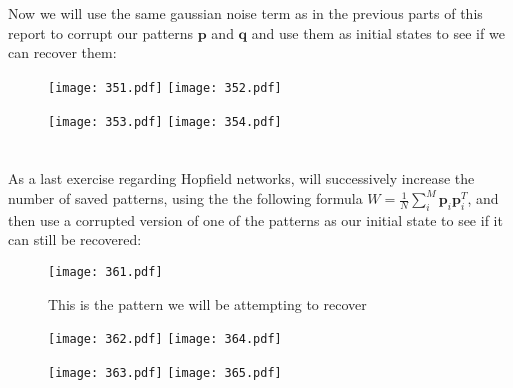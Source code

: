 \documentclass{article}
\begin{document}
\section{}
Now we will use the same gaussian noise term as in the previous parts of this report to corrupt our patterns $\boldsymbol{p}$ and $\boldsymbol{q}$ and use them as initial states to see if we can recover them:


\begin{figure}[ht]
    \centering
    \begin{minipage}{0.48\textwidth}
        \centering
        \texttt{[image: 351.pdf]}
        \texttt{[image: 352.pdf]}
    \end{minipage}\hfill
    \begin{minipage}{0.48\textwidth}
        \centering
        \texttt{[image: 353.pdf]}
        \texttt{[image: 354.pdf]}
    \end{minipage}
\end{figure}



\section{}
As a last exercise regarding Hopfield networks, will successively increase the number of saved patterns, using the the following formula $W = \frac{1}{N} \sum_{i}^{M}\boldsymbol{p}_i \boldsymbol{p}_i^T$, and then use a corrupted version of one of the patterns as our initial state to see if it can still be recovered:

\begin{figure}[ht]
    \centering
    \texttt{[image: 361.pdf]}
    \caption{This is the pattern we will be attempting to recover}
\end{figure}

\begin{figure}[ht]
    \centering
    \begin{minipage}{0.48\textwidth}
        \centering
        \texttt{[image: 362.pdf]}
        \texttt{[image: 364.pdf]}
    \end{minipage}\hfill
    \begin{minipage}{0.48\textwidth}
        \centering
        \texttt{[image: 363.pdf]}
        \texttt{[image: 365.pdf]}
    \end{minipage}
\end{figure}
\end{document}

